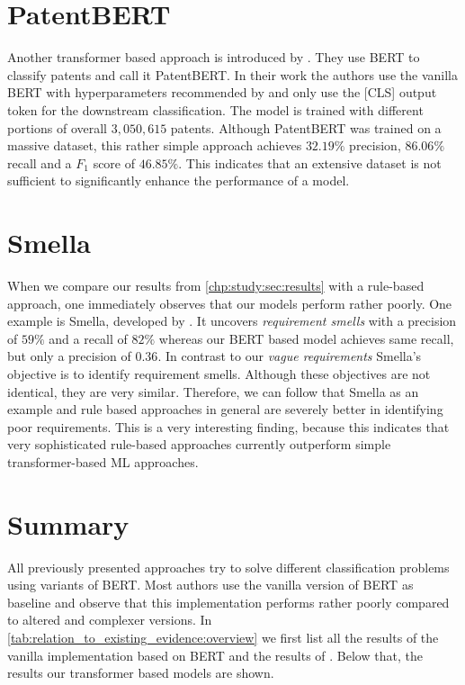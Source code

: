 \section{PatentBERT}
Another transformer based approach is introduced by \textcite{Lee:2019}.
They use \ac{BERT} to classify patents and call it PatentBERT.
In their work the authors use the vanilla \ac{BERT} with hyperparameters recommended by \textcite{Devlin:2018} and only use the [CLS] output token for the downstream classification.
The model is trained with different portions of overall $3,050,615$ patents.
Although PatentBERT was trained on a massive dataset, this rather simple approach achieves $32.19\%$ precision, $86.06\%$ recall and a $F_1$ score of $46.85\%$.
This indicates that an extensive dataset is not sufficient to significantly enhance the performance of a model.

\section{Smella}
When we compare our results from \cref{chp:study:sec:results} with a rule-based approach, one immediately observes that our models perform rather poorly.
One example is Smella, developed by \textcite{Femmer:2017}.
It uncovers \textit{requirement smells} with a precision of $59\%$ and a recall of $82\%$ whereas our \ac{BERT} based model achieves same recall, but only a precision of $0.36$.
In contrast to our \textit{vague requirements} Smella's objective is to identify requirement smells.
Although these objectives are not identical, they are very similar.
Therefore, we can follow that Smella as an example and rule based approaches in general are severely better in identifying poor requirements.
This is a very interesting finding, because this indicates that very sophisticated rule-based approaches currently outperform simple transformer-based \ac{ML} approaches.

\section{Summary}
All previously presented approaches try to solve different classification problems using variants of \ac{BERT}.
Most authors use the vanilla version of \ac{BERT} as baseline and observe that this implementation performs rather poorly compared to altered and complexer versions.
In \cref{tab:relation_to_existing_evidence:overview} we first list all the results of the vanilla implementation based on \ac{BERT} and the results of \textcite{Femmer:2017}.
Below that, the results our transformer based models are shown.

